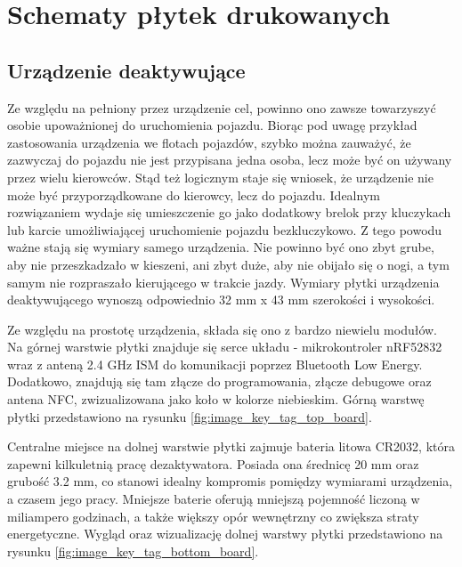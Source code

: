 \chapter{Schematy płytek drukowanych}
\label{boards}

\section{Urządzenie deaktywujące}

Ze względu na pełniony przez urządzenie cel, powinno ono zawsze towarzyszyć osobie upoważnionej do uruchomienia pojazdu. Biorąc pod uwagę przykład zastosowania urządzenia we flotach pojazdów, szybko można zauważyć, że zazwyczaj do pojazdu nie jest przypisana jedna osoba, lecz może być on używany przez wielu kierowców. Stąd też logicznym staje się wniosek, że urządzenie nie może być przyporządkowane do kierowcy, lecz do pojazdu. Idealnym rozwiązaniem wydaje się umieszczenie go jako dodatkowy brelok przy kluczykach lub karcie umożliwiającej uruchomienie pojazdu bezkluczykowo. Z tego powodu ważne stają się wymiary samego urządzenia. Nie powinno być ono zbyt grube, aby nie przeszkadzało w kieszeni, ani zbyt duże, aby nie obijało się o nogi, a tym samym nie rozpraszało kierującego w trakcie jazdy.
Wymiary płytki urządzenia deaktywującego wynoszą odpowiednio 32 mm x 43 mm szerokości i wysokości.

Ze względu na prostotę urządzenia, składa się ono z bardzo niewielu modułów.
Na górnej warstwie płytki znajduje się serce układu - mikrokontroler nRF52832 wraz z anteną 2.4 GHz ISM do komunikacji poprzez Bluetooth Low Energy. Dodatkowo, znajdują się tam złącze do programowania, złącze debugowe oraz antena NFC, zwizualizowana jako koło w kolorze niebieskim. Górną warstwę płytki przedstawiono na rysunku \ref{fig:image_key_tag_top_board}.

Centralne miejsce na dolnej warstwie płytki zajmuje bateria litowa CR2032, która zapewni kilkuletnią pracę dezaktywatora. Posiada ona średnicę 20 mm oraz grubość 3.2 mm, co stanowi idealny kompromis pomiędzy wymiarami urządzenia, a czasem jego pracy. Mniejsze baterie oferują mniejszą pojemność liczoną w miliampero godzinach, a także większy opór wewnętrzny co zwiększa straty energetyczne. Wygląd oraz wizualizację dolnej warstwy płytki przedstawiono na rysunku \ref{fig:image_key_tag_bottom_board}.

